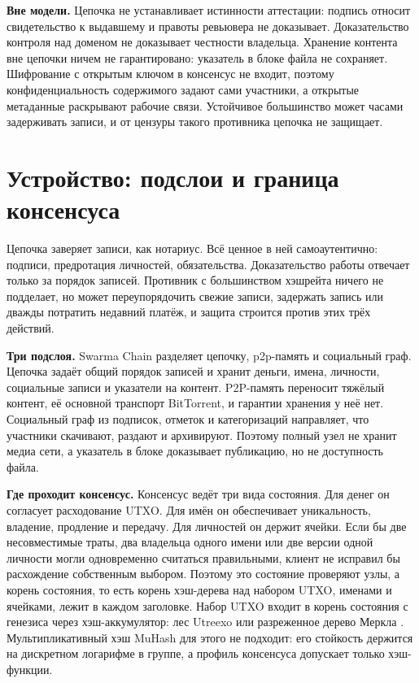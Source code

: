 \documentclass[10pt,a4paper]{article}
\begin{document}
\textbf{Вне модели.}
Цепочка не устанавливает истинности аттестации: подпись относит свидетельство к выдавшему и правоты ревьювера не доказывает.
Доказательство контроля над доменом не доказывает честности владельца.
Хранение контента вне цепочки ничем не гарантировано: указатель в блоке файла не сохраняет.
Шифрование с открытым ключом в консенсус не входит, поэтому конфиденциальность содержимого задают сами участники, а открытые метаданные раскрывают рабочие связи.
Устойчивое большинство может часами задерживать записи, и от цензуры такого противника цепочка не защищает.

\section{Устройство: подслои и граница консенсуса}
\label{sec:overview}

Цепочка заверяет записи, как нотариус.
Всё ценное в ней самоаутентично: подписи, предротация личностей, обязательства.
Доказательство работы отвечает только за порядок записей.
Противник с большинством хэшрейта ничего не подделает, но может переупорядочить свежие записи, задержать запись или дважды потратить недавний платёж, и защита строится против этих трёх действий.

\textbf{Три подслоя.}
Swarma Chain разделяет цепочку, p2p-память и социальный граф.
Цепочка задаёт общий порядок записей и хранит деньги, имена, личности, социальные записи и указатели на контент.
P2P-память переносит тяжёлый контент, её основной транспорт BitTorrent, и гарантии хранения у неё нет.
Социальный граф из подписок, отметок и категоризаций направляет, что участники скачивают, раздают и архивируют.
Поэтому полный узел не хранит медиа сети, а указатель в блоке доказывает публикацию, но не доступность файла.

\textbf{Где проходит консенсус.}
Консенсус ведёт три вида состояния.
Для денег он согласует расходование UTXO.
Для имён он обеспечивает уникальность, владение, продление и передачу.
Для личностей он держит ячейки.
Если бы две несовместимые траты, два владельца одного имени или две версии одной личности могли одновременно считаться правильными, клиент не исправил бы расхождение собственным выбором.
Поэтому это состояние проверяют узлы, а корень состояния, то есть корень хэш-дерева над набором UTXO, именами и ячейками, лежит в каждом заголовке.
Набор UTXO входит в корень состояния с генезиса через хэш-аккумулятор: лес Utreexo \cite{utreexo} или разреженное дерево Меркла \cite{smt}.
Мультипликативный хэш MuHash \cite{muhash} для этого не подходит: его стойкость держится на дискретном логарифме в группе, а профиль консенсуса допускает только хэш-функции.
\end{document}
